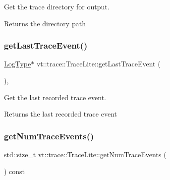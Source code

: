 Get the trace directory for output. 

\begin{DoxyReturn}{Returns}
the directory path 
\end{DoxyReturn}
\mbox{\label{structvt_1_1trace_1_1_trace_lite_aec2c076296efcabc54dfdb02de932837}} 
\subsubsection{\texorpdfstring{get\+Last\+Trace\+Event()}{getLastTraceEvent()}}
{\footnotesize\ttfamily \hyperlink{structvt_1_1trace_1_1_trace_lite_aeb73e523d31829d3163c877b145afa2a}{Log\+Type}$\ast$ vt\+::trace\+::\+Trace\+Lite\+::get\+Last\+Trace\+Event (\begin{DoxyParamCaption}{ }\end{DoxyParamCaption})\hspace{0.3cm}{\ttfamily [inline]}, {\ttfamily [noexcept]}}



Get the last recorded trace event. 

\begin{DoxyReturn}{Returns}
the last recorded trace event 
\end{DoxyReturn}
\mbox{\label{structvt_1_1trace_1_1_trace_lite_a01b746338f535ac1df0566f9705e2d1e}} 
\subsubsection{\texorpdfstring{get\+Num\+Trace\+Events()}{getNumTraceEvents()}}
{\footnotesize\ttfamily std\+::size\+\_\+t vt\+::trace\+::\+Trace\+Lite\+::get\+Num\+Trace\+Events (\begin{DoxyParamCaption}{ }\end{DoxyParamCaption}) const\hspace{0.3cm}{\ttfamily [inline]}}



